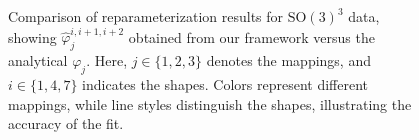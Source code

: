 \begin{figure}[!ht]
    \caption[Reparameterization of Curves in \(\mathrm{SO}(3)^3\)]{Comparison of reparameterization results for \(\mathrm{SO}(3)^3\) data, showing \(\hat{\varphi}_j^{i,i+1,i+2}\) obtained from our framework versus the analytical \(\varphi_j\). Here, \(j \in \{1, 2, 3\}\) denotes the mappings, and \(i \in \{1, 4, 7\}\) indicates the shapes. Colors represent different mappings, while line styles distinguish the shapes, illustrating the accuracy of the fit.}
    \label{fig:reparameterization-SO3-3-SLERP}
\end{figure}


